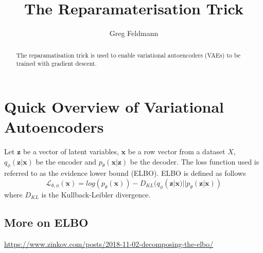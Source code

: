 \documentclass[]{article}
\title{The Reparamaterisation Trick}
\author{Greg Feldmann}
\begin{document}
\maketitle

\begin{abstract}
The reparamatisation trick is used to enable variational autoencoders (VAEs) to be trained with gradient descent.
\end{abstract}

\section{Quick Overview of Variational Autoencoders}
Let $\mathbf{z}$ be a vector of latent variables, $\mathbf{x}$ be a row vector from a dataset $X$, $q_{\phi}(\mathbf{z}|\mathbf{x})$ be the encoder and $p_{\theta}(\mathbf{x}|\mathbf{z})$ be the decoder. The loss function used is referred to as the evidence lower bound (ELBO). ELBO is defined as follows
\begin{equation} \mathcal{L}_{\theta, \phi}(\mathbf{x}) = log(p_{\theta}(\mathbf{x})) - D_{KL}(q_{\phi}(\mathbf{z}|\mathbf{x})||p_{\theta}(\mathbf{z}|\mathbf{x}))\end{equation}
where $D_{KL}$ is the Kullback-Leibler divergence.

\subsection{More on ELBO}

\url{https://www.zinkov.com/posts/2018-11-02-decomposing-the-elbo/}
\end{document}
